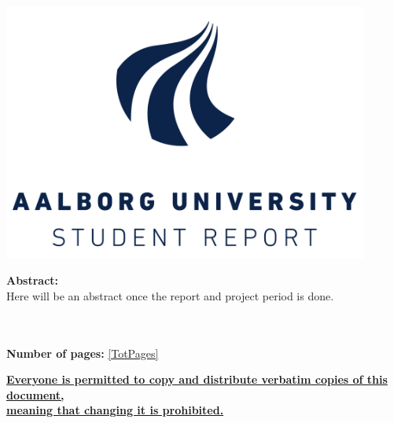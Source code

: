 \begin{minipage}[T]{0.45\textwidth}
 \begin{flushright}
  \includegraphics[width=0.9\textwidth]{images/aau_logo.pdf}\\
 \end{flushright}
 \begin{flushleft}
  \textbf{Abstract:}\\
  Here will be an abstract once the report and project period is done.%
 \end{flushleft}
\end{minipage}\\
\\\large{\textsf{\textbf{\normalsize{Number of pages:}}}} \ref{TotPages}\\
\begin{center}
 \begin{scriptsize}
  \textbf{\underline{Everyone is permitted to copy and distribute verbatim copies of this document,}}\\ \textbf{\underline{ meaning that changing it is prohibited.}}
 \end{scriptsize}
\end{center}
